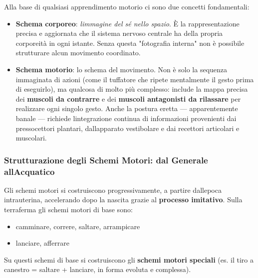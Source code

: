 \documentclass[a4paper,11pt]{article}
\providecommand{\tightlist}{%
  \setlength{\itemsep}{0pt}\setlength{\parskip}{0pt}}
\begin{document}
Alla base di qualsiasi apprendimento motorio ci sono due concetti
fondamentali:

\begin{itemize}
      \item
            \textbf{Schema corporeo}: \emph{l\textquotesingle immagine del sé
                  nello spazio}. È la rappresentazione precisa e aggiornata che il
            sistema nervoso centrale ha della propria corporeità in ogni istante.
            Senza questa "fotografia interna" non è possibile strutturare alcun
            movimento coordinato.
      \item
            \textbf{Schema motorio}: lo schema del movimento. Non è solo la
            sequenza immaginata di azioni (come il tuffatore che ripete
            mentalmente il gesto prima di eseguirlo), ma qualcosa di molto più
            complesso: include la mappa precisa dei \textbf{muscoli da contrarre}
            e dei \textbf{muscoli antagonisti da rilassare} per realizzare ogni
            singolo gesto. Anche la postura eretta --- apparentemente banale ---
            richiede l\textquotesingle integrazione continua di informazioni
            provenienti dai pressocettori plantari, dall\textquotesingle apparato
            vestibolare e dai recettori articolari e muscolari.
\end{itemize}

\subsubsection{Strutturazione degli Schemi Motori: dal Generale
      all\textquotesingle Acquatico}\label{strutturazione-degli-schemi-motori-dal-generale-allacquatico}

Gli schemi motori si costruiscono progressivamente, a partire
dall\textquotesingle epoca intrauterina, accelerando dopo la nascita
grazie al \textbf{processo imitativo}. Sulla terraferma gli schemi
motori di base sono:

\begin{itemize}
      \tightlist
      \item
            camminare, correre, saltare, arrampicare
      \item
            lanciare, afferrare
\end{itemize}

Su questi schemi di base si costruiscono gli \textbf{schemi motori
      speciali} (es. il tiro a canestro = saltare + lanciare, in forma evoluta
e complessa).
\end{document}
